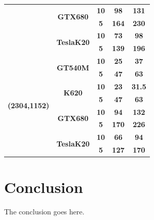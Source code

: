 \documentclass[conference]{IEEEtran}
\begin{document}
\begin{table}[]
\begin{tabular}{@{}cc|c|cc@{}}
                                     & \multirow{2}{*}{\textbf{GTX680}}   & \textbf{10}   & \textbf{98}  & \textbf{131}  \\ \cmidrule(l){3-5}
                                     &                                    & \textbf{5}    & \textbf{164}  & \textbf{230}  \\ \cmidrule(l){2-5}
                                     & \multirow{2}{*}{\textbf{TeslaK20}} & \textbf{10}   & \textbf{73}  & \textbf{98}   \\ \cmidrule(l){3-5}
                                     &                                    & \textbf{5}    & \textbf{139} & \textbf{196}  \\ \midrule
\multirow{8}{*}{\textbf{(2304,1152)}}& \multirow{2}{*}{\textbf{GT540M}}   & \textbf{10}   & \textbf{25}  & \textbf{37}   \\ \cmidrule(l){3-5} 
                                     &                                    & \textbf{5}    & \textbf{47}  & \textbf{63}   \\ \cmidrule(l){2-5} 
                                     & \multirow{2}{*}{\textbf{K620}}     & \textbf{10}   & \textbf{23}  & \textbf{31.5} \\ \cmidrule(l){3-5}
                                     &                                    & \textbf{5}    & \textbf{47}  & \textbf{63}    \\ \cmidrule(l){2-5}
                                     & \multirow{2}{*}{\textbf{GTX680}}   & \textbf{10}   & \textbf{94}  & \textbf{132}  \\ \cmidrule(l){3-5}
                                     &                                    & \textbf{5}    & \textbf{170} & \textbf{226}   \\ \cmidrule(l){2-5}
                                     & \multirow{2}{*}{\textbf{TeslaK20}} & \textbf{10}   & \textbf{66}  & \textbf{94}   \\ \cmidrule(l){3-5}
                                     &                                    & \textbf{5}    & \textbf{127} & \textbf{170}  \\ \bottomrule
\end{tabular}
\end{table}
\section{Conclusion}
The conclusion goes here.

\newpage






\end{document}
